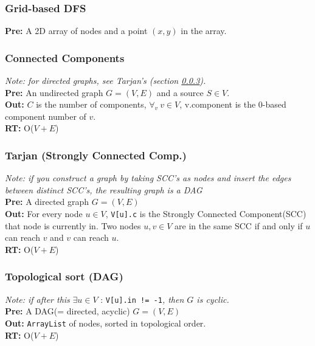 \documentclass[a4paper,10pt]{article}
\begin{document}
\begin{multicols}{2}
\subsubsection{Grid-based DFS}
\textbf{Pre:} A 2D array of nodes and a point $(x,y)$ in the array.


\subsubsection{Connected Components}
\textit{Note: for directed graphs, see Tarjan's (section \ref{sec:tarjan}).}\\
\textbf{Pre:} An undirected graph $G=(V,E)$ and a source $S\in V$.\\
\textbf{Out:} $C$ is the number of components, $\forall_v\ v\in V$, v.component is the 0-based component number of $v$.\\
\textbf{RT:} O($V+E$)


\subsubsection{Tarjan (Strongly Connected Comp.)}\label{sec:tarjan}
\textit{Note: if you construct a graph by taking SCC's as nodes and insert the edges between distinct SCC's, the resulting graph is a DAG}\\
\textbf{Pre:} A directed graph $G=(V,E)$\\
\textbf{Out:} For every node $u\in V$, \lstinline|V[u].c| is the Strongly Connected Component(SCC) that node is currently in. Two nodes $u,v\in V$ are in the same SCC if and only if $u$ can reach $v$ and  $v$ can reach $u$.\\
\textbf{RT:} O($V+E$)


\subsubsection{Topological sort (DAG)}\label{sec:topologicalsort}
\textit{Note: if after this} $\exists u\in V$ : \lstinline|V[u].in != -1|\textit{, then $G$ is cyclic.}\\
\textbf{Pre:} A DAG(= directed, acyclic) $G=(V,E)$\\
\textbf{Out:} \lstinline|ArrayList| of nodes, sorted in topological order.\\
\textbf{RT:} O($V+E$) 



\end{multicols}
\end{document}
